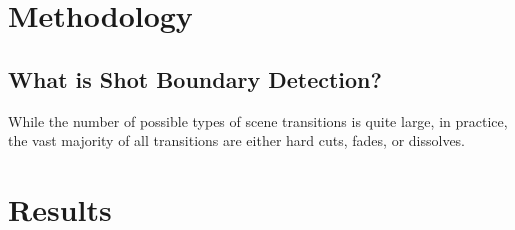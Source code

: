 \documentclass[12pt]{article}
\begin{document}
\section{Methodology}
\subsection{What is Shot Boundary Detection?}
While the number of possible types of scene transitions is quite large, in practice, the vast majority of all transitions are either hard cuts, fades, or dissolves. 
\clearpage

\section{Results}
\blindtext
\clearpage

{}

\clearpage
\end{document}

